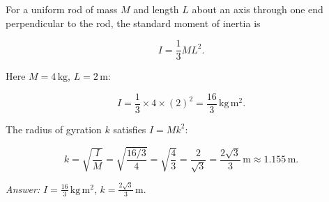 \documentclass[11pt]{article}
\begin{document}
\begin{corrige}
For a uniform rod of mass \(M\) and length \(L\) about an axis through one end perpendicular to the rod, the standard moment of inertia is

\[
I = \frac{1}{3} M L^2.
\]

Here \(M = 4\,\mathrm{kg}\), \(L = 2\,\mathrm{m}\):

\[
I = \frac{1}{3} \times 4 \times (2)^2 = \frac{16}{3}\,\mathrm{kg\,m^2}.
\]

The radius of gyration \(k\) satisfies \(I = M k^2\):

\[
k = \sqrt{\frac{I}{M}} = \sqrt{\frac{16/3}{4}} = \sqrt{\frac{4}{3}} = \frac{2}{\sqrt{3}} = \frac{2\sqrt{3}}{3}\,\mathrm{m} \approx 1.155\,\mathrm{m}.
\]

\emph{Answer:} \(I = \frac{16}{3}\,\mathrm{kg\,m^2}\), \(k = \frac{2\sqrt{3}}{3}\,\mathrm{m}\).
\end{corrige}
\end{document}
